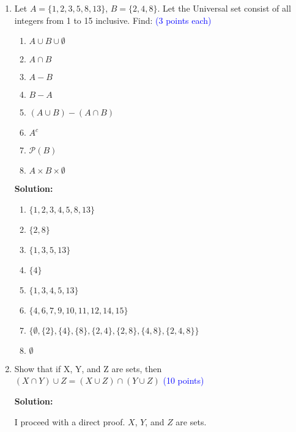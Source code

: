 \documentclass{article}
\newcommand{\pt}[1]{\textcolor{blue}{(#1 points)}}
\newcommand{\pte}[1]{\textcolor{blue}{(#1 points each)}}
\newenvironment{solution}
{
\par
\color{blue}
\textbf{Solution:}
}
{
\par
}
\begin{document}
\begin{enumerate}
    \item Let $A = \{1, 2, 3, 5, 8, 13\}$,  $B = \{2, 4, 8\}$. Let the Universal set consist of all integers from 1 to 15 inclusive. Find: \pte{3}
        \begin{enumerate}
            \item $A \cup B \cup \emptyset$
            \item $A \cap B$ 
            \item $A - B$
            \item $B - A$ 
            \item $(A \cup B) - (A \cap B)$ 
            \item $A^c$
            \item $\mathcal{P}(B)$
            \item $A \times B \times \emptyset$
        \end{enumerate}
    \begin{solution}
        \begin{enumerate}
            \item $\{1, 2, 3, 4, 5, 8, 13\}$
            \item $\{2,8\}$
            \item $\{1, 3, 5, 13\}$
            \item $\{4\}$
            \item $\{1, 3, 4, 5, 13\}$
            \item $\{4, 6, 7, 9, 10, 11, 12, 14, 15\}$
            \item $\{\emptyset, \{2\}, \{4\}, \{8\}, \{2, 4\}, \{2, 8\}, \{4, 8\}, \{2, 4, 8\}\}$
            \item $\emptyset$
        \end{enumerate}
    \end{solution}
    
    \item Show that if X, Y, and Z are sets, then $(X \cap Y) \cup Z = (X \cup Z) \cap (Y \cup Z)$ \pt{10}
    \begin{solution}
    I proceed with a direct proof. $X$, $Y$, and $Z$ are sets.
    

\end{solution}
\end{enumerate}
\end{document}
